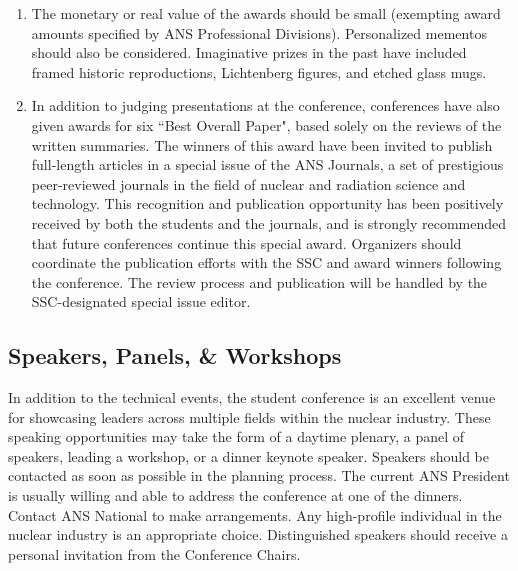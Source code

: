 \documentclass[12pt]{article}
\begin{document}
\begin{enumerate}
    \item The monetary or real value of the awards should be small (exempting award amounts specified by ANS Professional Divisions). Personalized mementos should also be considered. Imaginative prizes in the past have included framed historic reproductions, Lichtenberg figures, and etched glass mugs.
    \item In addition to judging presentations at the conference, conferences have also given awards for six ``Best Overall Paper", based solely on the reviews of the written summaries. The winners of this award have been invited to publish full-length articles in a special issue of the ANS Journals, a set of prestigious peer-reviewed journals in the field of nuclear and radiation science and technology. This recognition and publication opportunity has been positively received by both the students and the journals, and is strongly recommended that future conferences continue this special award. Organizers should coordinate the publication efforts with the SSC and award winners following the conference. The review process and publication will be handled by the SSC-designated special issue editor.
\end{enumerate}

\subsection{Speakers, Panels, \& Workshops}
In addition to the technical events, the student conference is an excellent venue for showcasing leaders across multiple fields within the nuclear industry.
These speaking opportunities may take the form of a daytime plenary, a panel of speakers, leading a workshop, or a dinner keynote speaker.
Speakers should be contacted as soon as possible in the planning process.
The current ANS President is usually willing and able to address the conference at one of the dinners.
Contact ANS National to make arrangements.
Any high-profile individual in the nuclear industry is an appropriate choice.
Distinguished speakers should receive a personal invitation from the Conference Chairs.
\end{document}
